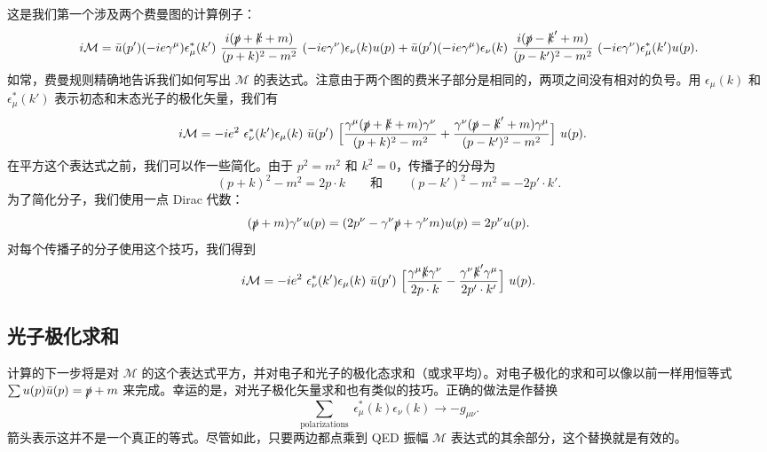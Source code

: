 这是我们第一个涉及两个费曼图的计算例子：
\begin{equation}
  i\mathcal{M} = \bar{u}(p')(-ie\gamma^\mu)\epsilon^{*}_{\mu}(k')\
    \frac{i(\slashed{p}+\slashed{k}+m)}{(p+k)^2-m^2}\
    (-ie\gamma^\nu)\epsilon_\nu(k)u(p)
    + \bar{u}(p')(-ie\gamma^\mu)\epsilon_\nu(k)\
      \frac{i(\slashed{p}-\slashed{k}'+m)}{(p-k')^2-m^2}\
      (-ie\gamma^\nu)\epsilon^{*}_\mu(k')u(p) .
\end{equation}
如常，费曼规则精确地告诉我们如何写出 $\mathcal{M}$ 的表达式。注意由于两个图的费米子部分是相同的，两项之间没有相对的负号。用 $\epsilon_\mu(k)$ 和 $\epsilon^{*}_\mu(k')$ 表示初态和末态光子的极化矢量，我们有
\begin{equation}
  \begin{aligned}
    i\mathcal{M} &= -ie^2\ \epsilon^{*}_{\nu}(k')\epsilon_\mu(k)\
      \bar{u}(p')\ \Bigl[
        \frac{\gamma^\mu(\slashed{p}+\slashed{k}+m)\gamma^\nu}{(p+k)^2-m^2}
        + \frac{\gamma^\nu(\slashed{p}-\slashed{k}'+m)\gamma^\mu}
          {(p-k')^2-m^2} \Bigr]\ u(p) .
  \end{aligned}
  \label{eq:5.74}
\end{equation}
在平方这个表达式之前，我们可以作一些简化。由于 $p^2 = m^2$ 和 $k^2 = 0$，传播子的分母为
\begin{equation}
  (p+k)^2 - m^2 = 2p\cdot k
  \qquad\text{和}\qquad
  (p-k')^2 - m^2 = -2p'\cdot k' .
\end{equation}
为了简化分子，我们使用一点 Dirac 代数：
\begin{equation}
  (\slashed{p}+m)\gamma^\nu u(p) = (2p^\nu - \gamma^\nu\slashed{p}
    + \gamma^\nu m)u(p) = 2p^\nu u(p) .
\end{equation}
对每个传播子的分子使用这个技巧，我们得到
\begin{equation}
  i\mathcal{M} = -ie^2\ \epsilon^{*}_{\nu}(k')\epsilon_\mu(k)\
    \bar{u}(p')\ \Bigl[ \frac{\gamma^\mu\slashed{k}\gamma^\nu}{2p\cdot k}
      - \frac{\gamma^\nu\slashed{k}'\gamma^\mu}{2p'\cdot k'} \Bigr]\ u(p) .
  \label{eq:5.74b}
\end{equation}

\subsection{光子极化求和}

计算的下一步将是对 $\mathcal{M}$ 的这个表达式平方，并对电子和光子的极化态求和（或求平均）。对电子极化的求和可以像以前一样用恒等式 $\sum u(p)\bar{u}(p) = \slashed{p} + m$ 来完成。幸运的是，对光子极化矢量求和也有类似的技巧。正确的做法是作替换
\begin{equation}
  \sum_{\text{polarizations}}\ \epsilon^{*}_\mu(k)\epsilon_\nu(k)
    \to -g_{\mu\nu} .
  \label{eq:5.75}
\end{equation}
箭头表示这并不是一个真正的等式。尽管如此，只要两边都点乘到 QED 振幅 $\mathcal{M}$ 表达式的其余部分，这个替换就是有效的。

